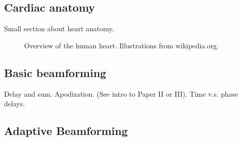 \subsection{Cardiac anatomy}
Small section about heart anatomy.

\begin{figure}
\centering
{}
\caption{Overview of the human heart. Illustrations from wikipedia.org.}
\label{fig:human_heart}
\end{figure}
							
\subsection{Basic beamforming}

Delay and sum. Apodization. (See intro to Paper II or III).
Time v.s. phase delays.

\subsection{Adaptive Beamforming}\label{sec:adaptbf}

